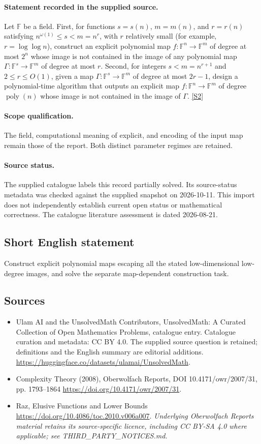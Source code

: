 \documentclass[11pt]{article}
\begin{document}
\paragraph{Statement recorded in the supplied source.}
Let $\mathbb{F}$ be a field. First, for functions $s=s(n)$, $m=m(n)$, and $r=r(n)$ satisfying $n^{\omega(1)}\leq s<m=n^r$, with $r$ relatively small (for example, $r=\log\log n$), construct an explicit polynomial map $f:\mathbb{F}^n\to\mathbb{F}^m$ of degree at most $2^n$ whose image is not contained in the image of any polynomial map $\Gamma:\mathbb{F}^s\to\mathbb{F}^m$ of degree at most $r$. Second, for integers $s<m=n^{r+1}$ and $2\leq r\leq O(1)$, given a map $\Gamma:\mathbb{F}^s\to\mathbb{F}^m$ of degree at most $2r-1$, design a polynomial-time algorithm that outputs an explicit map $f:\mathbb{F}^n\to\mathbb{F}^m$ of degree $\operatorname{poly}(n)$ whose image is not contained in the image of $\Gamma$. \href{https://doi.org/10.4171/owr/2007/31}{[S2]}
\paragraph{Scope qualification.}
The field, computational meaning of explicit, and encoding of the input map remain those of the report. Both distinct parameter regimes are retained.
\paragraph{Source status.}
The supplied catalogue labels this record partially solved. Its source-status metadata was checked against the supplied snapshot on 2026-10-11. This import does not independently establish current open status or mathematical correctness. The catalogue literature assessment is dated 2026-08-21.
\subsection{Short English statement}
Construct explicit polynomial maps escaping all the stated low-dimensional low-degree images, and solve the separate map-dependent construction task.
\subsection{Sources}
\begin{itemize}
\item[S1] Ulam AI and the UnsolvedMath Contributors, UnsolvedMath: A Curated Collection of Open Mathematics Problems, catalogue entry. Catalogue curation and metadata: CC BY 4.0. The supplied source question is retained; definitions and the English summary are editorial additions.
\url{https://huggingface.co/datasets/ulamai/UnsolvedMath}.
\item[S2] Complexity Theory (2008), Oberwolfach Reports, DOI 10.4171/owr/2007/31, pp. 1793--1864
\url{https://doi.org/10.4171/owr/2007/31}.
\item[S3] Raz, Elusive Functions and Lower Bounds
\url{https://doi.org/10.4086/toc.2010.v006a007}.
\textit{Underlying Oberwolfach Reports material retains its source-specific licence, including CC BY-SA 4.0 where applicable; see THIRD\_PARTY\_NOTICES.md.}
\end{itemize}
\end{document}
